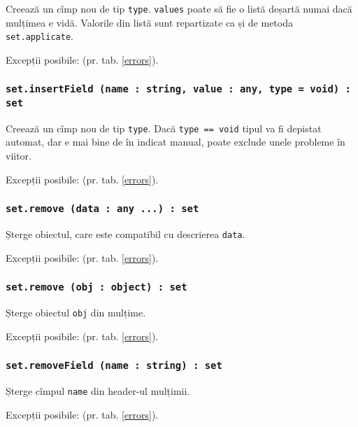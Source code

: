 Creează un cîmp nou de tip \texttt{type}. \texttt{values} poate să fie o listă deșartă numai dacă mulțimea e vidă. Valorile din listă sunt repartizate ca și de metoda \texttt{set.applicate}.

Excepții posibile:  (pr. tab. \ref{errors}).

\subsubsection{\texttt{set.insertField (name : string, value : any, type = void) : set}}

Creează un cîmp nou de tip \texttt{type}. Dacă \texttt{type == void} tipul va fi depistat automat, dar e mai bine de în indicat manual, poate exclude unele probleme în viitor.

Excepții posibile:  (pr. tab. \ref{errors}).

\subsubsection{\texttt{set.remove (data : any ...) : set}}

Șterge obiectul, care este compatibil cu descrierea \texttt{data}.

Excepții posibile:  (pr. tab. \ref{errors}).

\subsubsection{\texttt{set.remove (obj : object) : set}}

Șterge obiectul \texttt{obj} din mulțime.

Excepții posibile:  (pr. tab. \ref{errors}).

\subsubsection{\texttt{set.removeField (name : string) : set}}

Șterge cîmpul \texttt{name} din header-ul mulțimii.

Excepții posibile:  (pr. tab. \ref{errors}).

